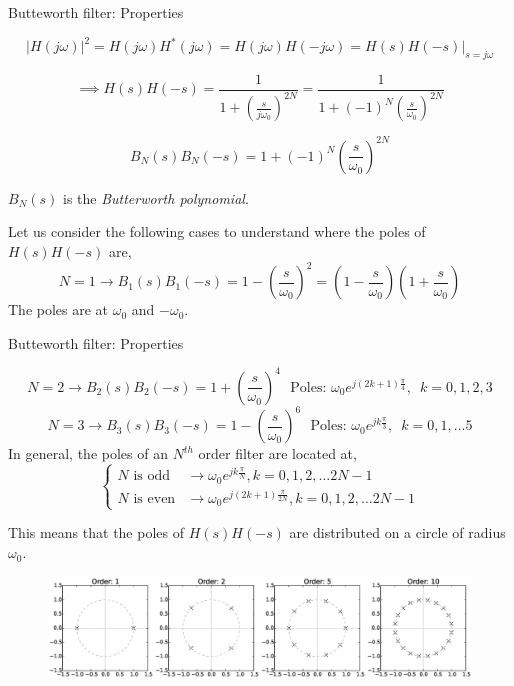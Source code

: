 \documentclass{beamer}
\begin{document}
\begin{frame}{Butteworth filter: Properties}
\begin{small}
\[ \left|H(j\omega)\right|^2 = H(j\omega)H^*(j\omega) = H(j\omega)H(-j\omega) = H(s)H(-s)\bigg|_{s=j\omega} \]

\[\implies H(s)H(-s) = \frac{1}{1 + \left(\frac{s}{j\omega_0}\right)^{2N}} = \frac{1}{1 + \left(-1\right)^N\left(\frac{s}{\omega_0}\right)^{2N}} \]

\[ B_N(s)B_N(-s) = 1 + (-1)^N\left(\frac{s}{\omega_0}\right)^{2N} \]

$B_N(s)$ is the \textit{Butterworth polynomial}.

Let us consider the following cases to understand where the poles of $H(s)H(-s)$ are,
\[ N=1 \longrightarrow B_1(s)B_1(-s) = 1 - \left(\frac{s}{\omega_0}\right)^{2} = \left(1 - \frac{s}{\omega_0}\right)\left(1 + \frac{s}{\omega_0}\right) \]
The poles are at $\omega_0$ and $-\omega_0$.
\end{small}
\end{frame}

\begin{frame}{Butteworth filter: Properties}
\begin{small}
\[ N=2 \longrightarrow B_2(s)B_2(-s) = 1 + \left(\frac{s}{\omega_0}\right)^{4} \,\,\,\, \text{Poles: } \omega_0e^{j(2k+1)\frac{\pi}{4}}, \,\,\, k = 0, 1, 2, 3 \]
\[ N=3 \longrightarrow B_3(s)B_3(-s) = 1 - \left(\frac{s}{\omega_0}\right)^{6} \,\,\,\, \text{Poles: } \omega_0e^{jk\frac{\pi}{3}}, \,\,\, k = 0, 1, \ldots 5 \]
In general, the poles of an $N^{th}$ order filter are located at,
\[ \begin{cases}
N \text{ is odd} & \longrightarrow \omega_0e^{jk\frac{\pi}{N}}, k = 0, 1, 2, \ldots 2N-1\\
N \text{ is even} & \longrightarrow \omega_0e^{j(2k+1)\frac{\pi}{2N}}, k = 0, 1, 2, \ldots 2N-1
\end{cases} \]

This means that the poles of $H(s)H(-s)$ are distributed on a circle of radius $\omega_0$.
\end{small}
\vspace{-5mm}

\begin{figure}
\centering
\includegraphics[width=1.1\textwidth]{img/butter_poles.eps}
\end{figure}
\end{frame}
\end{document}
